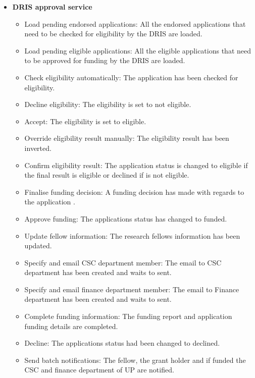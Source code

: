 \documentclass[12pt]{article}
\begin{document}
\begin{itemize}
	\item \textbf{DRIS approval service}
		\begin{itemize}
			\item Load pending endorsed applications: All the endorsed applications that need to be checked for eligibility by the DRIS are loaded.
			\item Load pending eligible applications: All the eligible applications that need to be approved for funding by the DRIS are loaded.
			\item Check eligibility automatically: The application has been checked for eligibility.
			\item Decline eligibility: The eligibility is set to not eligible.
			\item Accept: The eligibility is set to eligible.
			\item Override eligibility result manually: The eligibility result has been inverted.
			\item Confirm eligibility result: The application status is changed to eligible if the final result is eligible or declined if is not eligible. 
			\item Finalise funding decision: A funding decision has made with regards to the application .			
			\item Approve funding: The applications status has changed to funded.
			\item Update fellow information: The research fellows information has been updated. 
			\item Specify and email CSC department member: The email to CSC department has been created and waits to sent.
			\item Specify and email finance department member: The email to Finance department has been created and waits to sent.
			\item Complete funding information:	The funding report and application funding details are completed. 
			\item Decline: The applications status had been changed to declined.
			\item Send batch notifications: The fellow, the grant holder and if funded the CSC and finance department of UP are notified.											
		\end{itemize}
	

\end{itemize}
\end{document}
